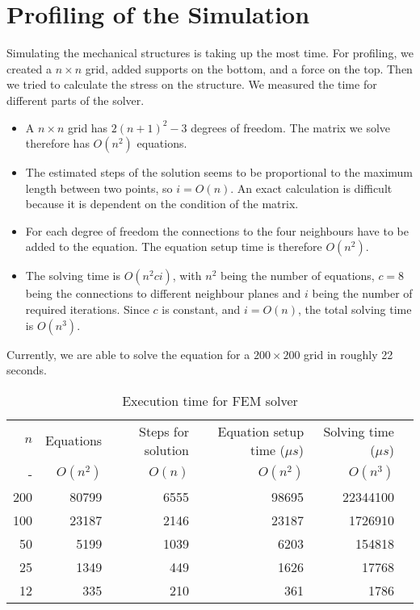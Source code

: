 \documentclass[12pt]{article}
\begin{document}
\section*{Profiling of the Simulation}

Simulating the mechanical structures is taking up the most time. For profiling, we created a $n \times n$ grid, added supports on the bottom, and a force on the top. Then we tried to calculate the stress on the structure. We measured the time for different parts of the solver.


\begin{itemize}
    \item A $n \times n$ grid has $2 (n + 1)^2 - 3$ degrees of freedom. The matrix we solve therefore has $O(n^2)$ equations.
    
    \item The estimated steps of the solution seems to be proportional to the maximum length between two points, so $i=O(n)$. An exact calculation is difficult because it is dependent on the condition of the matrix.
    
    \item For each degree of freedom the connections to the four neighbours have to be added to the equation. The equation setup time is therefore $O(n^2)$.
    
    \item The solving time is $O(n^2 c i)$, with $n^2$ being the number of equations, $c=8$ being the connections to different neighbour planes and $i$ being the number of required iterations. Since $c$ is constant, and $i = O(n)$, the total solving time is $O(n^3)$.
\end{itemize}

Currently, we are able to solve the equation for a $200\times200$ grid in roughly 22 seconds.

\begin{table}[h]
    \centering
    \small
    \begin{tabular}{rrrrrr}
        $n$ & Equations & Steps for solution & Equation setup time ($\mu s$) & Solving time ($\mu s$)\\
        - & $O(n^2)$ & $O(n)$ & $O(n^2)$ & $O(n^3)$\\
        200 & 80799 & 6555 & 98695 & 22344100 \\
        100 & 23187 & 2146 & 23187 & 1726910 \\
        50 & 5199 & 1039 & 6203 & 154818 \\
        25 & 1349 & 449 & 1626 & 17768 \\
        12 & 335 & 210 & 361 & 1786
    \end{tabular}
    \caption{Execution time for FEM solver}
    \label{tab:profiling}
\end{table}
\end{document}
